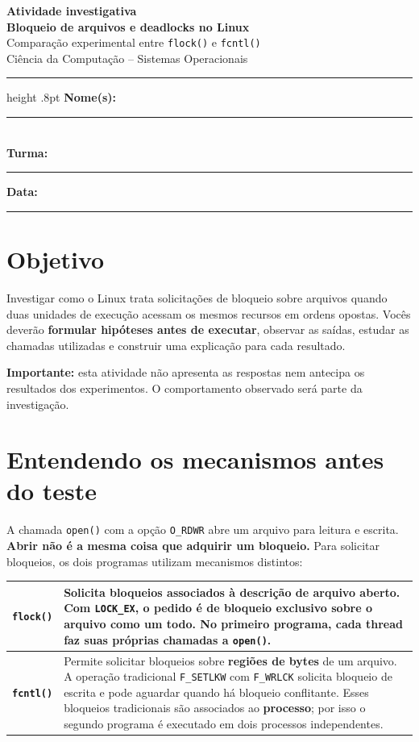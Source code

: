\documentclass[11pt,a4paper]{article}
\begin{document}
\begin{center}
{\Large\bfseries\color{azul} Atividade investigativa}\\[4pt]
{\large\bfseries Bloqueio de arquivos e deadlocks no Linux}\\[8pt]
{\normalsize Comparação experimental entre \texttt{flock()} e \texttt{fcntl()}}\\[7pt]
{\footnotesize Ciência da Computação \;--\; Sistemas Operacionais}
\end{center}
\vspace{2mm}
\color{azul}\hrule height .8pt\color{black}
\vspace{3mm}
\textbf{Nome(s):} \rule{12cm}{.4pt}\\[5pt]
\textbf{Turma:} \rule{5cm}{.4pt}\hfill\textbf{Data:} \rule{4cm}{.4pt}

\section{Objetivo}
Investigar como o Linux trata solicitações de bloqueio sobre arquivos quando duas unidades de execução acessam os mesmos recursos em ordens opostas. Vocês deverão \textbf{formular hipóteses antes de executar}, observar as saídas, estudar as chamadas utilizadas e construir uma explicação para cada resultado.

\textbf{Importante:} esta atividade não apresenta as respostas nem antecipa os resultados dos experimentos. O comportamento observado será parte da investigação.

\section{Entendendo os mecanismos antes do teste}
A chamada \texttt{open()} com a opção \texttt{O\_RDWR} abre um arquivo para leitura e escrita. \textbf{Abrir não é a mesma coisa que adquirir um bloqueio.} Para solicitar bloqueios, os dois programas utilizam mecanismos distintos:

\smallskip
\renewcommand{\arraystretch}{1.23}
\begin{tabularx}{\textwidth}{>{\bfseries}p{2.25cm}X}
\hline
\texttt{flock()} & Solicita bloqueios associados à \textbf{descrição de arquivo aberto}. Com \texttt{LOCK\_EX}, o pedido é de bloqueio exclusivo sobre o arquivo como um todo. No primeiro programa, cada thread faz suas próprias chamadas a \texttt{open()}.\\
\hline
\texttt{fcntl()} & Permite solicitar bloqueios sobre \textbf{regiões de bytes} de um arquivo. A operação tradicional \texttt{F\_SETLKW} com \texttt{F\_WRLCK} solicita bloqueio de escrita e pode aguardar quando há bloqueio conflitante. Esses bloqueios tradicionais são associados ao \textbf{processo}; por isso o segundo programa é executado em dois processos independentes.\\
\hline
\end{tabularx}
\normalsize
\end{document}
